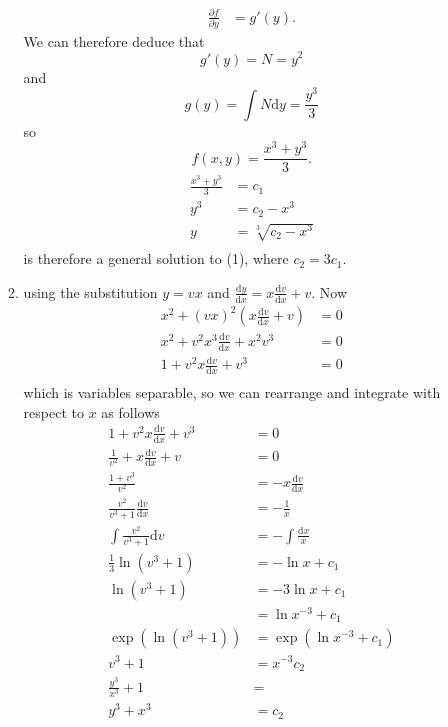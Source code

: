 \documentclass[10pt]{article}
\newcommand*{\dydx}[0]{\frac{\text{d}y}{\text{d}x}}
\newcommand*{\dy}[0]{\text{d}y}
\newcommand*{\dx}[0]{\text{d}x}
\newcommand*{\dv}[0]{\text{d}v}
\newcommand*{\D}[2]{\frac{\partial{#1}}{\partial{#2}}}%
\newcommand*{\df}[2]{\frac{\text{d}{#1}}{\text{d}{#2}}}%
\begin{document}
\begin{enumerate}
\begin{enumerate}
\begin{align*}
                    \D{f}{y} &= g'(y).
                \end{align*}
                We can therefore deduce that $$g'(y) = N = y^2$$ and $$g(y) = \int
                N \dy = \frac{y^3}{3}$$ so $$f(x,y) = \frac{x^3 + y^3}{3}.$$
                \begin{align*}
                    \frac{x^3 + y^3}{3} &= c_1 \\
                    y^3 &= c_2-x^3 \\
                    y &= \sqrt[3]{c_2-x^3} \\
                \end{align*}
                is therefore a general solution to (1), where $c_2 = 3c_1$.
            \item using the substitution $y = vx$ and $\dydx = x\df{v}{x} + v$.
                Now
                \begin{align*}
                    x^2 + (vx)^2(x\df{v}{x} + v) &= 0 \\
                    x^2 + v^2x^3\df{v}{x} + x^2v^3 &= 0 \\
                    1 + v^2x\df{v}{x} + v^3 &= 0 \\
                \end{align*}
                which is variables separable, so we can rearrange and integrate
                with respect to $x$ as follows
                \begin{align*}
                    1 + v^2x\df{v}{x} + v^3 &= 0 \\
                    \frac{1}{v^2} + x\df{v}{x} + v &= 0 \\
                    \frac{1 + v^3}{v^2} &= - x\df{v}{x}  \\
                    \frac{v^2}{v^3 + 1}\df{v}{x} &= - \frac{1}{x}  \\
                    \int \frac{v^2}{v^3 + 1}\dv &= - \int \frac{\dx}{x}  \\
                    \frac{1}{3} \ln(v^3 + 1) &= - \ln x + c_1\\
                    \ln(v^3 + 1) &= - 3 \ln x + c_1\\
                    &= \ln x^{-3} + c_1\\
                    \exp(\ln(v^3 + 1)) &= \exp(\ln x^{-3} + c_1) \\
                    v^3 + 1 &= x^{-3}c_2 \\
                    \frac{y^3}{x^3} + 1 &=  \\
                    y^3 + x^3 &= c_2 \\

\end{align*}
\end{enumerate}
\end{enumerate}
\end{document}
